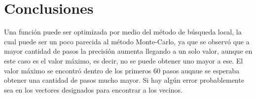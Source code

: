 \documentclass{article}
\begin{document}
\newpage

\section{Conclusiones}

Una función puede ser optimizada por medio del método de búsqueda local, la cual puede ser un poco parecida al método Monte-Carlo, ya que se observó que a mayor cantidad de pasos la precisión aumenta llegando a un solo valor, aunque en este caso es el valor máximo, es decir, no se puede obtener uno mayor a ese.
El valor máximo se encontró dentro de los primeros 60 pasos auqnue se esperaba obtener una cantidad de pasos mucho mayor. Si hay algún error probablemente sea en los vectores designados para encontrar a los vecinos.




\end{document}
